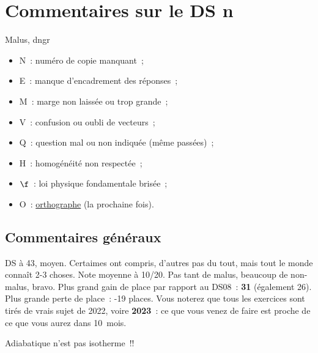 \documentclass[a4paper, 11pt, final, garamond]{book}
\begin{document}
\setcounter{chapter}{9}

\chapter{Commentaires sur le DS n}

\begin{tprop}{Malus, dngr}
	\begin{minipage}{0.50\linewidth}
		\begin{itemize}
			\item N~: numéro de copie manquant~;
			\item E~: manque d'encadrement des réponses~;
			\item M~: marge non laissée ou trop grande~;
			\item V~: confusion ou oubli de vecteurs~;
		\end{itemize}
	\end{minipage}
	\begin{minipage}{0.50\linewidth}
		\begin{itemize}
			\item Q~: question mal ou non indiquée (même passées)~;
			\item H~: homogénéité non respectée~;
			\item $\f$~: loi physique fondamentale brisée~;
			\item O~: \ul{orthographe} (la prochaine fois).
		\end{itemize}
	\end{minipage}
\end{tprop}

\section{Commentaires généraux}

DS à 43, moyen. Certaimes ont compris, d'autres pas du tout, mais tout le monde
connaît 2-3 choses. Note moyenne à 10/20. Pas tant de malus, beaucoup de
non-malus, bravo. Plus grand gain de place par rapport au DS08~: \textbf{31}
(également 26). Plus grande perte de place~: -19 places. Vous noterez que tous
les exercices sont tirés de vrais sujet de 2022, voire \textbf{2023}~: ce que
vous venez de faire est proche de ce que vous aurez dans \SI{10}{mois}.

\begin{center}
	\begin{framed}
		\huge
		Adiabatique n'est pas isotherme~!!
	\end{framed}
\end{center}
\end{document}
